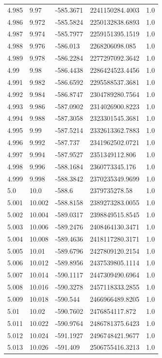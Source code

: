 \begin{tabular}{lllll}
4.985 & 9.97 & -585.3671 & 2241150284.4003 & 1.0 \\
4.986 & 9.972 & -585.5824 & 2250132838.6893 & 1.0 \\
4.987 & 9.974 & -585.7977 & 2259151395.1519 & 1.0 \\
4.988 & 9.976 & -586.013 & 2268206098.085 & 1.0 \\
4.989 & 9.978 & -586.2284 & 2277297092.3642 & 1.0 \\
4.99 & 9.98 & -586.4438 & 2286424523.4456 & 1.0 \\
4.991 & 9.982 & -586.6592 & 2295588537.3681 & 1.0 \\
4.992 & 9.984 & -586.8747 & 2304789280.7564 & 1.0 \\
4.993 & 9.986 & -587.0902 & 2314026900.8223 & 1.0 \\
4.994 & 9.988 & -587.3058 & 2323301545.3681 & 1.0 \\
4.995 & 9.99 & -587.5214 & 2332613362.7883 & 1.0 \\
4.996 & 9.992 & -587.737 & 2341962502.0721 & 1.0 \\
4.997 & 9.994 & -587.9527 & 2351349112.806 & 1.0 \\
4.998 & 9.996 & -588.1684 & 2360773345.176 & 1.0 \\
4.999 & 9.998 & -588.3842 & 2370235349.9699 & 1.0 \\
5.0 & 10.0 & -588.6 & 2379735278.58 & 1.0 \\
5.001 & 10.002 & -588.8158 & 2389273283.0055 & 1.0 \\
5.002 & 10.004 & -589.0317 & 2398849515.8545 & 1.0 \\
5.003 & 10.006 & -589.2476 & 2408464130.3471 & 1.0 \\
5.004 & 10.008 & -589.4636 & 2418117280.3171 & 1.0 \\
5.005 & 10.01 & -589.6796 & 2427809120.2154 & 1.0 \\
5.006 & 10.012 & -589.8956 & 2437539805.1114 & 1.0 \\
5.007 & 10.014 & -590.1117 & 2447309490.6964 & 1.0 \\
5.008 & 10.016 & -590.3278 & 2457118333.2855 & 1.0 \\
5.009 & 10.018 & -590.544 & 2466966489.8205 & 1.0 \\
5.01 & 10.02 & -590.7602 & 2476854117.872 & 1.0 \\
5.011 & 10.022 & -590.9764 & 2486781375.6423 & 1.0 \\
5.012 & 10.024 & -591.1927 & 2496748421.9677 & 1.0 \\
5.013 & 10.026 & -591.409 & 2506755416.3213 & 1.0 \\

\end{tabular}
